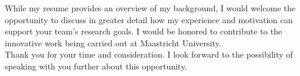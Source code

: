 \documentclass[11pt,a4paper,roman]{moderncv}
\begin{document}
\vspace{1em}
While my resume provides an overview of my background, I would welcome the opportunity to discuss in greater detail how my experience and motivation can support your team's research goals. I would be honored to contribute to the innovative work being carried out at Maastricht University.\\

\vspace{1em}
Thank you for your time and consideration. I look forward to the possibility of speaking with you further about this opportunity.

\vspace{0.5cm}


\makeletterclosing
\end{document}
